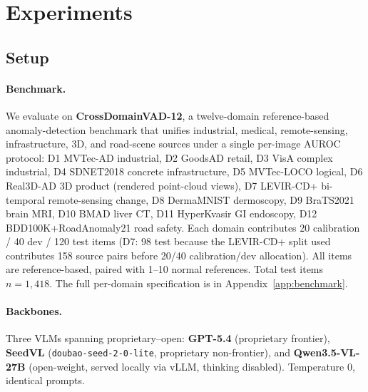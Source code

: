 \section{Experiments}
\label{sec:experiments}

\subsection{Setup}
\label{ssec:setup}

\paragraph{Benchmark.}
We evaluate on \textbf{CrossDomainVAD-12}, a twelve-domain reference-based anomaly-detection benchmark that unifies industrial, medical, remote-sensing, infrastructure, 3D, and road-scene sources under a single per-image AUROC protocol: D1 MVTec-AD industrial, D2 GoodsAD retail, D3 VisA complex industrial, D4 SDNET2018 concrete infrastructure, D5 MVTec-LOCO logical, D6 Real3D-AD 3D product (rendered point-cloud views), D7 LEVIR-CD+ bi-temporal remote-sensing change, D8 DermaMNIST dermoscopy, D9 BraTS2021 brain MRI, D10 BMAD liver CT, D11 HyperKvasir GI endoscopy, D12 BDD100K+RoadAnomaly21 road safety. Each domain contributes 20 calibration / 40 dev / 120 test items (D7: 98 test because the LEVIR-CD+ split used contributes 158 source pairs before 20/40 calibration/dev allocation). All items are reference-based, paired with 1--10 normal references. Total test items $n{=}1{,}418$. The full per-domain specification is in Appendix~\ref{app:benchmark}.

\paragraph{Backbones.}
Three VLMs spanning proprietary--open: \textbf{GPT-5.4} (proprietary frontier), \textbf{SeedVL} (\texttt{doubao-seed-2-0-lite}, proprietary non-frontier), and \textbf{Qwen3.5-VL-27B} (open-weight, served locally via vLLM, thinking disabled). Temperature $0$, identical prompts.

